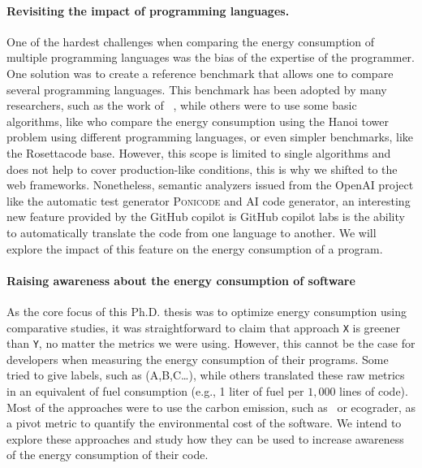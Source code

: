 \paragraph{Revisiting the impact of programming languages.}
One of the hardest challenges when comparing the energy consumption of multiple programming languages was the bias of the expertise of the programmer.
One solution was to create a reference benchmark that allows one to compare several programming languages.
This benchmark has been adopted by many researchers, such as the work of \citeauthor{couto2017towards}~\cite{couto2017towards}, while others were to use some basic algorithms, like \cite{noureddine_preliminary_2012} who compare the energy consumption using the Hanoi tower problem using different programming languages, or even simpler benchmarks, like the Rosettacode base.
However, this scope is limited to single algorithms and does not help to cover production-like conditions, this is why we shifted to the web frameworks.
Nonetheless, semantic analyzers issued from the OpenAI project like the automatic test generator \textsc{Ponicode} and AI code generator, an interesting new feature provided by the GitHub copilot is GitHub copilot labs is the ability to automatically translate the code from one language to another.
We will explore the impact of this feature on the energy consumption of a program.


\paragraph{Raising awareness about the energy consumption of software}
As the core focus of this Ph.D. thesis was to optimize energy consumption using comparative studies, it was straightforward to claim that approach \texttt{X} is greener than \texttt{Y}, no matter the metrics we were using.
However, this cannot be the case for developers when measuring the energy consumption of their programs.
Some tried to give labels, such as (A,B,C\dots), while others translated these raw metrics in an equivalent of fuel consumption (e.g., 1 liter of fuel per $1,000$ lines of code).
Most of the approaches were to use the carbon emission, such as~\cite{patterson2021carbon} or ecograder, as a pivot metric to quantify the environmental cost of the software.
We intend to explore these approaches and study how they can be used to increase awareness of the energy consumption of their code.

